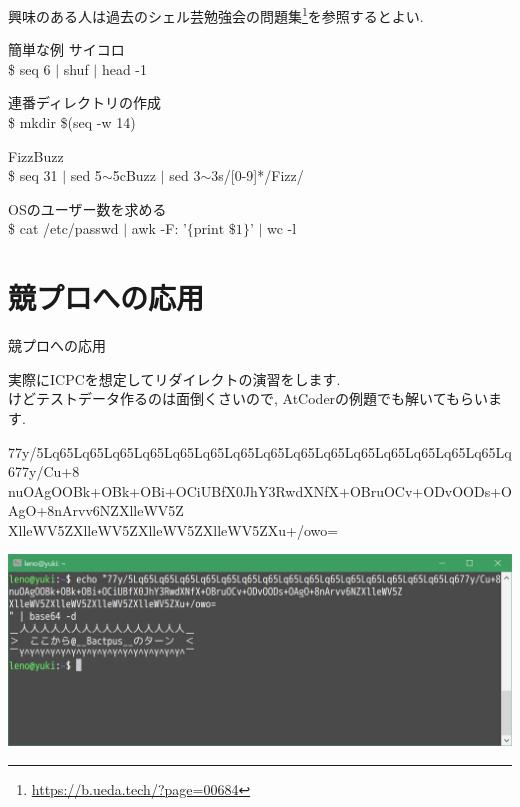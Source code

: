 \documentclass[uplatex, dvipdfmx, unicode]{beamer}
\begin{document}
\begin{frame}
  興味のある人は過去のシェル芸勉強会の問題集\footnote{\url{https://b.ueda.tech/?page=00684}}を参照するとよい.
\end{frame}

\begin{frame}{簡単な例}
  サイコロ \\
  \$ seq 6 $|$ shuf $|$ head -1 \\
  \vspace{0.2in}

  連番ディレクトリの作成 \\
  \$ mkdir \$(seq -w 14)
  \vspace{0.2in}
  
  FizzBuzz \\
  \$ seq 31 $|$ sed 5$\sim$5cBuzz $|$ sed 3$\sim$3s/[0-9]*/Fizz/
  \vspace{0.2in}

  OSのユーザー数を求める \\
  \$ cat /etc/passwd $|$ awk -F: '$\{\text{print \$1}\}$' $|$ wc -l
\end{frame}

\section{競プロへの応用}
\begin{frame}
  \centering
  \Huge{競プロへの応用}
\end{frame}

\begin{frame}
  実際にICPCを想定してリダイレクトの演習をします. \\
  けどテストデータ作るのは面倒くさいので, AtCoderの例題でも解いてもらいます. \\
\end{frame}

\begin{frame}
  \fontsize{7pt}{0pt}\selectfont
  77y/5Lq65Lq65Lq65Lq65Lq65Lq65Lq65Lq65Lq65Lq65Lq65Lq65Lq65Lq65Lq65Lq677y/Cu+8 \\
  nuOAgOOBk+OBk+OBi+OCiUBfX0JhY3RwdXNfX+OBruOCv+ODvOODs+OAgO+8nArvv6NZXlleWV5Z \\
  XlleWV5ZXlleWV5ZXlleWV5ZXlleWV5ZXu+/owo=
\end{frame}

\begin{frame}
  \includegraphics[keepaspectratio, scale=.5]{./img/sd.png}
\end{frame}
\end{document}
